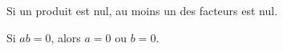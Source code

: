Si un produit est nul, au moins un des facteurs est nul. \par\smallskip\noindent
Si $ab=0$, alors $a=0$ ou $b=0$.